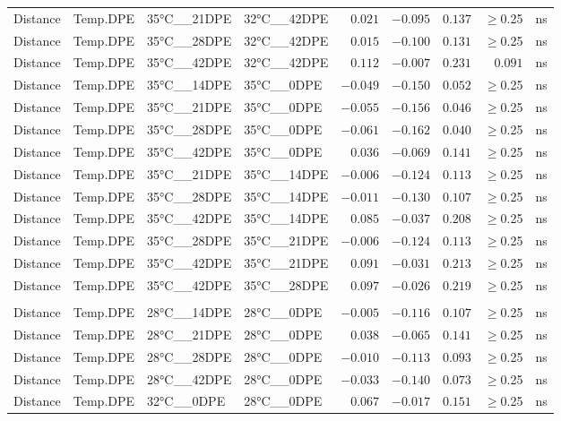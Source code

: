\documentclass[
]{article}
\begin{document}
\begin{longtable}{llllrrrrl}
Distance & Temp.DPE & 35°C\_\_21DPE & 32°C\_\_42DPE & $0.021$ & $-0.095$ & $0.137$ & $\geq$0.25 & ns \\ 
Distance & Temp.DPE & 35°C\_\_28DPE & 32°C\_\_42DPE & $0.015$ & $-0.100$ & $0.131$ & $\geq$0.25 & ns \\ 
Distance & Temp.DPE & 35°C\_\_42DPE & 32°C\_\_42DPE & $0.112$ & $-0.007$ & $0.231$ & $0.091$ & ns \\ 
Distance & Temp.DPE & 35°C\_\_14DPE & 35°C\_\_0DPE & $-0.049$ & $-0.150$ & $0.052$ & $\geq$0.25 & ns \\ 
Distance & Temp.DPE & 35°C\_\_21DPE & 35°C\_\_0DPE & $-0.055$ & $-0.156$ & $0.046$ & $\geq$0.25 & ns \\ 
Distance & Temp.DPE & 35°C\_\_28DPE & 35°C\_\_0DPE & $-0.061$ & $-0.162$ & $0.040$ & $\geq$0.25 & ns \\ 
Distance & Temp.DPE & 35°C\_\_42DPE & 35°C\_\_0DPE & $0.036$ & $-0.069$ & $0.141$ & $\geq$0.25 & ns \\ 
Distance & Temp.DPE & 35°C\_\_21DPE & 35°C\_\_14DPE & $-0.006$ & $-0.124$ & $0.113$ & $\geq$0.25 & ns \\ 
Distance & Temp.DPE & 35°C\_\_28DPE & 35°C\_\_14DPE & $-0.011$ & $-0.130$ & $0.107$ & $\geq$0.25 & ns \\ 
Distance & Temp.DPE & 35°C\_\_42DPE & 35°C\_\_14DPE & $0.085$ & $-0.037$ & $0.208$ & $\geq$0.25 & ns \\ 
Distance & Temp.DPE & 35°C\_\_28DPE & 35°C\_\_21DPE & $-0.006$ & $-0.124$ & $0.113$ & $\geq$0.25 & ns \\ 
Distance & Temp.DPE & 35°C\_\_42DPE & 35°C\_\_21DPE & $0.091$ & $-0.031$ & $0.213$ & $\geq$0.25 & ns \\ 
Distance & Temp.DPE & 35°C\_\_42DPE & 35°C\_\_28DPE & $0.097$ & $-0.026$ & $0.219$ & $\geq$0.25 & ns \\ 
\midrule\addlinespace[2.5pt]
\multicolumn{9}{l}{gunifrac} \\ 
\midrule\addlinespace[2.5pt]
Distance & Temp.DPE & 28°C\_\_14DPE & 28°C\_\_0DPE & $-0.005$ & $-0.116$ & $0.107$ & $\geq$0.25 & ns \\ 
Distance & Temp.DPE & 28°C\_\_21DPE & 28°C\_\_0DPE & $0.038$ & $-0.065$ & $0.141$ & $\geq$0.25 & ns \\ 
Distance & Temp.DPE & 28°C\_\_28DPE & 28°C\_\_0DPE & $-0.010$ & $-0.113$ & $0.093$ & $\geq$0.25 & ns \\ 
Distance & Temp.DPE & 28°C\_\_42DPE & 28°C\_\_0DPE & $-0.033$ & $-0.140$ & $0.073$ & $\geq$0.25 & ns \\ 
Distance & Temp.DPE & 32°C\_\_0DPE & 28°C\_\_0DPE & $0.067$ & $-0.017$ & $0.151$ & $\geq$0.25 & ns \\ 

\end{longtable}
\end{document}
